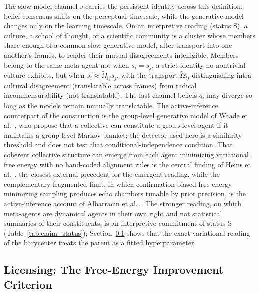 \documentclass[11pt]{article}
\begin{document}
The slow model channel $s$ carries the persistent identity across this definition: belief consensus shifts on the perceptual timescale, while the generative model changes only on the learning timescale. On an interpretive reading (status S), a culture, a school of thought, or a scientific community is a cluster whose members share enough of a common slow generative model, after transport into one another's frames, to render their mutual disagreements intelligible. Members belong to the same meta-agent not when $s_i = s_j$, a strict identity no nontrivial culture exhibits, but when $s_i \approx \tilde\Omega_{ij} s_j$, with the transport $\tilde\Omega_{ij}$ distinguishing intra-cultural disagreement (translatable across frames) from radical incommensurability (not translatable). The fast-channel beliefs $q_i$ may diverge so long as the models remain mutually translatable. The active-inference counterpart of the construction is the group-level generative model of Waade et al.~\cite{waade2025asone}, who propose that a collective can constitute a group-level agent if it maintains a group-level Markov blanket; the detector used here is a similarity threshold and does not test that conditional-independence condition. That coherent collective structure can emerge from each agent minimizing variational free energy with no hand-coded alignment rules is the central finding of Heins et al.~\cite{heins2024collective}, the closest external precedent for the emergent reading, while the complementary fragmented limit, in which confirmation-biased free-energy-minimizing sampling produces echo chambers tunable by prior precision, is the active-inference account of Albarracin et al.~\cite{albarracin2022epistemic}. The stronger reading, on which meta-agents are dynamical agents in their own right and not statistical summaries of their constituents, is an interpretive commitment of status S (Table~\ref{tab:claim_status}); Section~\ref{sec:meta_agent_variational} shows that the exact variational reading of the barycenter treats the parent as a fitted hyperparameter.

\subsection{Licensing: The Free-Energy Improvement Criterion}
\label{sec:meta_agent_variational}
\end{document}
